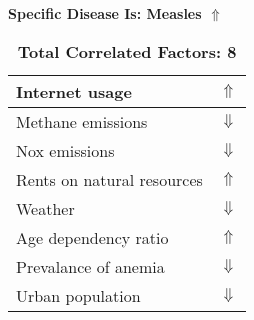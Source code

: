 \documentclass[12pt,notitlepage,oneside]{report}
\begin{document}
\clearpage
\begin{table}[!htb]
\caption{\textbf{Specific Disease Is: Measles $\Uparrow$}}
\centering
\label{Correlated Socio-economic Factors0}
\begin{tabular}{|l|l|}
\hline
Internet usage & $\Uparrow$\\ \hline
Methane emissions & $\Downarrow$\\ \hline
Nox emissions & $\Downarrow$\\ \hline
Rents on natural resources & $\Uparrow$\\ \hline
Weather & $\Downarrow$\\ \hline
Age dependency ratio & $\Uparrow$\\ \hline
Prevalance of anemia & $\Downarrow$\\ \hline
Urban population & $\Downarrow$\\ \hline
\end{tabular}
\caption*{\textbf{Total Correlated Factors: 8}}
\end{table}
\end{document}
